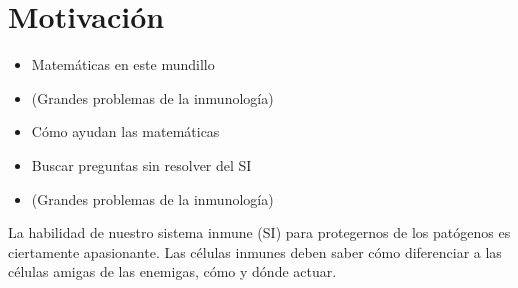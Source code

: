 %
%


\section{Motivación}

\begin{itemize}
	\item Matemáticas en este mundillo
	\item (Grandes problemas de la inmunología)
	\item Cómo ayudan las matemáticas
\end{itemize}

\begin{itemize}
	\item Buscar preguntas sin resolver del SI
	\item (Grandes problemas de la inmunología)
\end{itemize}
La habilidad de nuestro sistema inmune (SI) para protegernos de los patógenos es ciertamente apasionante. Las células inmunes deben saber cómo diferenciar a las células amigas de las enemigas, cómo y dónde actuar.

